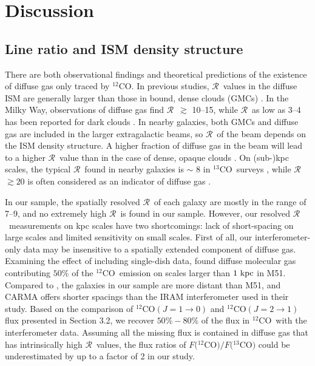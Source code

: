 \documentclass{emulateapj}
\def\ttco{\mbox{$^{13}$CO}}
\def\twco{\mbox{$^{12}$CO}}
\def\rtt{$\mathcal{R}$}
\begin{document}
\section{Discussion}\label{sec:discussion}

\subsection{Line ratio and ISM density structure}\label{sec:diffuse}


There are both observational findings and theoretical predictions of 
the existence of diffuse gas only traced by \twco. 
In previous studies, \rtt \ values in the diffuse ISM are generally larger than 
those in bound, dense clouds (GMCs) \citep{Blitz1984, Knapp1988}.   
In the Milky Way, observations of diffuse gas find \rtt \ $\gtrsim$ 10--15, 
while \rtt \ as low as 3--4 has been reported for dark clouds 
\citep{Liszt2010}. 
In nearby galaxies, both GMCs and diffuse gas are included in 
the larger extragalactic beams, so 
\rtt \ of the beam depends on the ISM density structure. 
A higher fraction of diffuse gas in the beam 
will lead to a higher \rtt \ value than in the case of dense, 
opaque clouds \citep{Wilson1994}. 
On (sub-)kpc scales, the typical \rtt \ found in nearby galaxies is
$\sim$ 8 in \ttco \ surveys \citep[e.g.][]{Y&S1986,Paglione2001}, 
while \rtt \ $\gtrsim 20$ is often considered as an indicator of
diffuse gas \citep[e.g.][]{Aalto2010}. 



In our sample, the spatially resolved \rtt \ of each galaxy  
are mostly in the range of 7--9, and no extremely high \rtt \ is found in our sample. 
However, our resolved \rtt \ measurements on kpc scales have two shortcomings:  
lack of short-spacing on large scales 
and limited sensitivity on small scales.  
First of all, 
our interferometer-only data may be insensitive to a spatially 
extended component of diffuse gas. 
Examining the effect of including single-dish data,
\citet{Pety2013} found diffuse molecular gas  
contributing $50\%$ of the \twco \ emission on scales larger than $1 \rm \  kpc$ in M51. 
Compared to \citet{Pety2013},  the galaxies in our sample are more distant than M51, 
and CARMA offers shorter spacings than the IRAM interferometer used in
their study. 
Based on the comparison of \twco$(J = 1 \rightarrow 0)$ and \twco$(J = 2
\rightarrow 1)$ flux presented in Section 3.2, 
we recover $50\% - 80\%$ of the flux in \twco \ with the interferometer data. 
Assuming all the missing flux is contained in diffuse gas 
that has intrinsically high \rtt \ values,  
the flux ratios of $F($\twco$)/F($\ttco$)$ could be underestimated by
up to a factor of 2 in our study.
\end{document}
